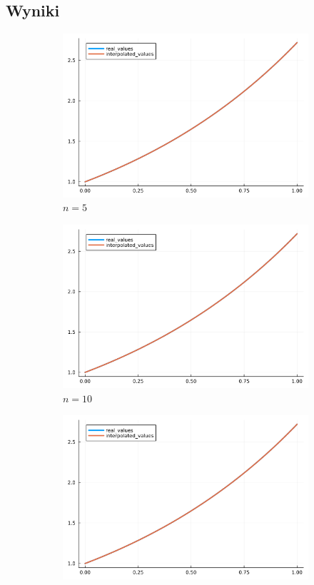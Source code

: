 \documentclass{article}
\def\v{0.47}
\begin{document}
\subsection*{Wyniki}
	\begin{figure}[H]
	    \centering
		\begin{subfigure}[b]{\v\linewidth}
			\includegraphics[width=\linewidth]{graphs/zad5.a.5.png}
			\caption{$n = 5$}
		\end{subfigure}
		\begin{subfigure}[b]{\v\linewidth}
			\includegraphics[width=\linewidth]{graphs/zad5.a.10.png}
			\caption{$n = 10$}
		\end{subfigure}
		\begin{subfigure}[b]{\v\linewidth}
			\includegraphics[width=\linewidth]{graphs/zad5.a.15.png}

\end{subfigure}
\end{figure}
\end{document}
